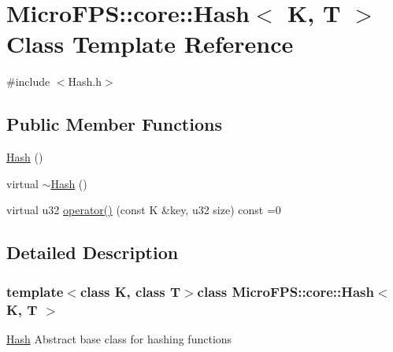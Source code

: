 \hypertarget{class_micro_f_p_s_1_1core_1_1_hash}{
\section{MicroFPS::core::Hash$<$ K, T $>$ Class Template Reference}
\label{de/d32/class_micro_f_p_s_1_1core_1_1_hash}
}


{\ttfamily \#include $<$Hash.h$>$}

\subsection*{Public Member Functions}
\begin{DoxyCompactItemize}
\item 
\hyperlink{class_micro_f_p_s_1_1core_1_1_hash_a059a1b43b81b3b39f81b8d71269a62a8}{Hash} ()
\item 
virtual \hyperlink{class_micro_f_p_s_1_1core_1_1_hash_a35eebce9a73d3452a0693bf17a502d8b}{$\sim$Hash} ()
\item 
virtual u32 \hyperlink{class_micro_f_p_s_1_1core_1_1_hash_ac09df61206d211ee5bbdbe64a1624d47}{operator()} (const K \&key, u32 size) const =0
\end{DoxyCompactItemize}


\subsection{Detailed Description}
\subsubsection*{template$<$class K, class T$>$class MicroFPS::core::Hash$<$ K, T $>$}

\hyperlink{class_micro_f_p_s_1_1core_1_1_hash}{Hash} Abstract base class for hashing functions 


